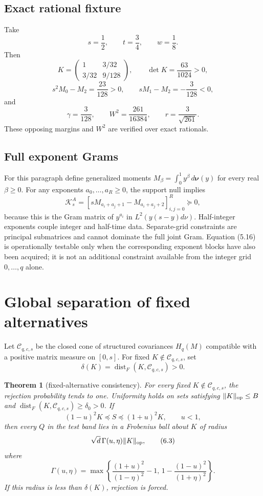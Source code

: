 \documentclass[11pt]{article}
\newtheorem{theorem}{Theorem}[section]
\newcommand{\dist}{\operatorname{dist}}
\newcommand{\cC}{\mathcal C}
\newcommand{\norm}[1]{\lVert #1\rVert}
\begin{document}
\subsection{Exact rational fixture}

Take
\[
 s=\frac12,\qquad t=\frac34,\qquad w=\frac18.                     \tag{5.12}
\]
Then
\[
 K=\begin{pmatrix}1&3/32\\3/32&9/128\end{pmatrix},\qquad
 \det K=\frac{63}{1024}>0,                                        \tag{5.13}
\]
\[
 s^2M_0-M_2=\frac{23}{128}>0,\qquad
 sM_1-M_2=-\frac3{128}<0,                                        \tag{5.14}
\]
and
\[
 \gamma=\frac3{128},\qquad W^2=\frac{261}{16384},\qquad
 r=\frac3{\sqrt{261}}.                                            \tag{5.15}
\]
These opposing margins and $W^2$ are verified over exact rationals.

\subsection{Full exponent Grams}

For this paragraph define generalized moments
$M_\beta=\int_0^1y^\beta\,d\bm\nu(y)$ for every real $\beta\ge0$.
For any exponents $a_0,\ldots,a_R\ge0$, the support null implies
\[
 \mathcal K_s^A=
 [sM_{a_i+a_j+1}-M_{a_i+a_j+2}]_{i,j=0}^R\succeq0,               \tag{5.16}
\]
because this is the Gram matrix of $y^{a_i}$ in
$L^2(y(s-y)d\nu)$.  Half-integer exponents couple integer and half-time
data.  Separate-grid constraints are principal submatrices and cannot
dominate the full joint Gram.  Equation (5.16) is operationally testable only
when the corresponding exponent blocks have also been acquired; it is not an
additional constraint available from the integer grid $0,\ldots,q$ alone.

\section{Global separation of fixed alternatives}

Let $\cC_{q,c,s}$ be the closed cone of structured covariances $H_q(M)$
compatible with a positive matrix measure on $[0,s]$.  For fixed
$K\notin\cC_{q,c,s}$, set
\[
 \delta(K)=\dist_F(K,\cC_{q,c,s})>0.                              \tag{6.1}
\]

\begin{theorem}[fixed-alternative consistency]\label{thm:fixed}
For every fixed $K\notin\cC_{q,c,s}$, the rejection probability tends to one.
Uniformity holds on sets satisfying $\norm K_{\rm op}\le B$ and
$\dist_F(K,\cC_{q,c,s})\ge\delta_0>0$.  If
\[
 (1-u)^2K\preceq S\preceq(1+u)^2K,\qquad u<1,                    \tag{6.2}
\]
then every $Q$ in the test band lies in a Frobenius ball about $K$ of radius
\[
 \sqrt d\,\Gamma(u,\eta)\norm{K}_{\rm op},                        \tag{6.3}
\]
where
\[
 \Gamma(u,\eta)=\max\left\{
 \frac{(1+u)^2}{(1-\eta)^2}-1,\,
 1-\frac{(1-u)^2}{(1+\eta)^2}\right\}.                            \tag{6.4}
\]
If this radius is less than $\delta(K)$, rejection is forced.
\end{theorem}
\end{document}
